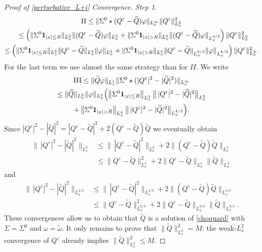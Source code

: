 \documentclass[JEP,XML,SOM,NoEqCountersInSection,NoFloatCountersInSection,Unicode,published]{cedram}
\theoremstyle{definition}
\newenvironment{ProofOf}[1]{\begin{proof}[Proof of #1]}{\end{proof}}
\begin{document}
\begin{ProofOf}{\eqref{perturbative_L+i} Convergence. Step 1}
\bgroup
{}
\begin{multline*}
\textup{II}\leq\|\Sigma^{0}\star(Q^{\varepsilon}-\widetilde{Q})\varphi\|_{L_{x}^{\infty}}\|Q^{\varepsilon}\|_{L_{x}^{2}}^{2}\\
\shoveleft{\hphantom{\textup{II}}\leq\left(\|\Sigma^{0}\mathbf{1}_{|x|\leq R}\|_{L_{x}^{2}}\|(Q^{\varepsilon}-\widetilde{Q})\varphi\|_{L_{x}^{2}}+\|\Sigma^{0}\mathbf{1}_{|x|>R}\|_{L_{x}^{4}}\|(Q^{\varepsilon}-\widetilde{Q})\varphi\|_{L_{x}^{4/3}}\right)\|Q^{\varepsilon}\|_{L_{x}^{2}}^{2}}\\
\leq\left(\|\Sigma^{0}\mathbf{1}_{|x|\leq R}\|_{L_{x}^{2}}\|Q^{\varepsilon}-\widetilde{Q}\|_{L_{x}^{4}}\|\varphi\|_{L_{x}^{4}}+\|\Sigma^{0}\mathbf{1}_{|x|>R}\|_{L_{x}^{4}}\|Q^{\varepsilon}-\widetilde{Q}\|_{L_{x}^{8/3}}\|\varphi\|_{L_{x}^{8/3}}\right)\|Q^{\varepsilon}\|_{L_{x}^{2}}^{2}.
\end{multline*}
\egroup
For the last term we use almost the same strategy than for $II$. We write
\begin{multline*}
\textup{III}\leq\|\widetilde{Q}\varphi\|_{L_{x}^{1}}\|\Sigma^{0}\star(|Q^{\varepsilon}|^{2}-|\widetilde{Q}|^{2})\|_{L_{x}^{\infty}}\\
\leq\|\widetilde{Q}\|_{L_{x}^{2}}\|\varphi\|_{L_{x}^{2}}\Bigl(\left\|\Sigma^{0}\mathbf{1}_{|x|\leq R}\right\|_{L_{x}^{2}}\bigl\|\,|Q^{\varepsilon}|^{2}-|\widetilde{Q}|^{2}\bigr\|_{L_{x}^{2}}\\
+\left\|\Sigma^{0}\mathbf{1}_{|x|>R}\right\|_{L_{x}^{4}}\bigl\|\,|Q^{\varepsilon}|^{2}-|\widetilde{Q}|^{2}\bigr\|_{L_{x}^{4/3}}\Bigr).
\end{multline*}
Since $|Q^{\varepsilon}|^{2}-|\widetilde{Q}|^{2}=|Q^{\varepsilon}-\widetilde{Q}|^{2}+2(Q^{\varepsilon}-\widetilde{Q})\widetilde{Q}$ we eventually obtain
\begin{align*}
\bigl\|\,|Q^{\varepsilon}|^{2}-|\widetilde{Q}|^{2}\bigr\|_{L_{x}^{2}}&\leq\bigl\|\,|Q^{\varepsilon}-\widetilde{Q}|^{2}\bigr\|_{L_{x}^{2}}+2\bigl\|(Q^{\varepsilon}-\widetilde{Q})\widetilde{Q}\bigr\|_{L_{x}^{2}}\\
&\leq\bigl\|Q^{\varepsilon}-\widetilde{Q}\bigr\|_{L_{x}^{4}}^{2}+2\bigl\|Q^{\varepsilon}-\widetilde{Q}\bigr\|_{L_{x}^{4}}\bigl\|\widetilde{Q}\bigr\|_{L_{x}^{4}}
\end{align*}
and
\begin{align*}
\bigl\|\,|Q^{\varepsilon}|^{2}-|\widetilde{Q}|^{2}\bigr\|_{L_{x}^{4/3}}&\leq\bigl\|\,|Q^{\varepsilon}-\widetilde{Q}|^{2}\bigr\|_{L_{x}^{4/3}}+2\bigl\|(Q^{\varepsilon}-\widetilde{Q})\widetilde{Q}\bigr\|_{L_{x}^{4/3}}\\
&\leq\bigl\|Q^{\varepsilon}-\widetilde{Q}\bigr\|_{L_{x}^{8/3}}^{2}+2\bigl\|Q^{\varepsilon}-\widetilde{Q}\bigr\|_{L_{x}^{8/3}}\bigl\|\widetilde{Q}\bigr\|_{L_{x}^{8/3}}.
\end{align*}
These convergences allow us to obtain that $\widetilde{Q}$ is a solution of \eqref{choquard} with $\Sigma=\Sigma^{0}$ and $\omega=\widetilde{\omega}$. It only remains to prove that $\|\widetilde{Q}\|_{L_{x}^{2}}^{2}=M$: the weak-$L_{x}^{2}$ convergence of $Q^{\varepsilon}$ already implies $\|\widetilde{Q}\|_{L_{x}^{2}}^{2}\leq M$.


\end{ProofOf}
\end{document}
